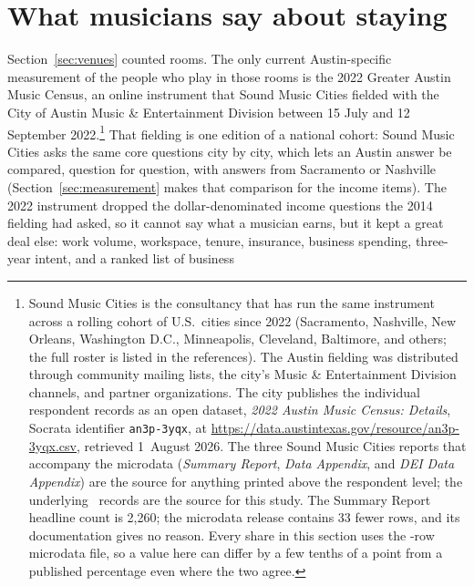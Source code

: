 \section{What musicians say about staying}
\label{sec:census}

Section~\ref{sec:venues} counted rooms. The only current Austin-specific
measurement of the people who play in those rooms is the 2022 Greater Austin
Music Census, an online instrument that Sound Music Cities fielded with the
City of Austin Music \& Entertainment Division between 15 July and 12 September
2022.\footnote{Sound Music Cities is the consultancy that has run the same
instrument across a rolling cohort of U.S.\ cities since 2022 (Sacramento,
Nashville, New Orleans, Washington D.C., Minneapolis, Cleveland, Baltimore,
and others; the full roster is listed in the references). The Austin fielding
was distributed through community mailing lists, the city's Music \&
Entertainment Division channels, and partner organizations. The city
publishes the individual respondent records as an open dataset,
\textit{2022 Austin Music Census: Details}, Socrata identifier
\texttt{an3p-3yqx}, at \url{https://data.austintexas.gov/resource/an3p-3yqx.csv},
retrieved 1~August 2026. The three Sound Music Cities reports that accompany
the microdata (\textit{Summary Report}, \textit{Data Appendix}, and
\textit{DEI Data Appendix}) are the source for anything printed above the
respondent level; the underlying \NCensusNRespondents\ records are the source
for this study. The Summary Report headline count is 2,260; the microdata
release contains 33 fewer rows, and its documentation gives no reason. Every
share in this section uses the \NCensusNRespondents-row microdata file, so a
value here can differ by a few tenths of a point from a published percentage
even where the two agree.} That fielding is one edition of a national cohort:
Sound Music Cities asks the same core questions city by city, which lets an
Austin answer be compared, question for question, with answers from Sacramento
or Nashville (Section~\ref{sec:measurement} makes that comparison for the
income items). The 2022 instrument dropped the dollar-denominated income
questions the 2014 fielding had asked, so it cannot say what a musician earns,
but it kept a great deal else: work volume, workspace, tenure, insurance,
business spending, three-year intent, and a ranked list of business
